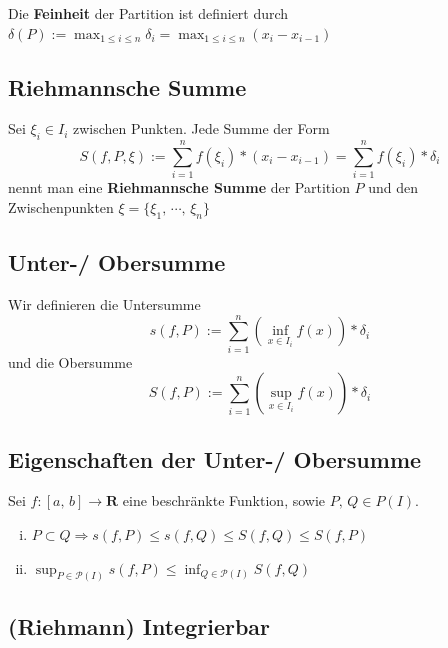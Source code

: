 \documentclass[8pt]{extarticle}
\begin{document}
\begin{multicols*}{3}
Die \textbf{Feinheit} der Partition ist definiert durch $\delta(P) := \max_{1 \leq i \leq n} \delta_i = \max_{1 \leq i \leq n} (x_i - x_{i - 1})$

\subsection{Riehmannsche Summe}

Sei $\xi_i \in I_i$ zwischen Punkten. Jede Summe der Form
$$
  S(f, P, \xi) := \sum_{i = 1}^n f(\xi_i) * (x_i - x_{i - 1}) = \sum_{i = 1}^n f(\xi_i) * \delta_i
$$
nennt man eine \textbf{Riehmannsche Summe} der Partition $P$ und den Zwischenpunkten $\xi = \{\xi_1,\, \cdots,\, \xi_n\}$

\subsection{Unter-/ Obersumme}

Wir definieren die Untersumme
$$
  s(f, P) := \sum_{i = 1}^n (\inf_{x \in I_i} f(x)) * \delta_i
$$
und die Obersumme
$$
  S(f, P) := \sum_{i = 1}^n (\sup_{x \in I_i} f(x)) * \delta_i
$$

\subsection{Eigenschaften der Unter-/ Obersumme}

Sei $f: [a,\, b] \rightarrow \mathbf{R}$ eine beschränkte Funktion, sowie $P,\, Q \in P(I)$.
\begin{enumerate}[(i)]
  \item $P \subset Q \Rightarrow s(f, P) \leq s(f, Q) \leq S(f, Q) \leq S(f, P)$
  \item $\sup_{P \in \mathcal{P}(I)} s(f, P) \leq \inf_{Q \in \mathcal{P}(I)} S(f, Q)$
\end{enumerate}

\subsection{(Riehmann) Integrierbar}


\end{multicols*}
\end{document}

